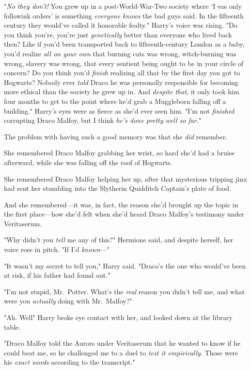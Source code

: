 "\emph{No they don't!} You grew up in a post-World-War-Two society where `I vas
only followink orders' is something \emph{everyone knows} the bad guys said. In
the fifteenth century they would've called it honorable fealty." Harry's voice
was rising. "Do you think you're, you're just \emph{genetically} better than
everyone who lived back then? Like if you'd been transported back to
fifteenth-century London as a baby, you'd realize \emph{all on your own} that
burning cats was wrong, witch-burning was wrong, slavery was wrong, that every
sentient being ought to be in your circle of concern? Do you think you'd
\emph{finish} realizing all that by the first day you got to Hogwarts? Nobody
ever \emph{told} Draco he was personally responsible for becoming more ethical
than the society he grew up in. And \emph{despite that}, it only took him four
months to get to the point where he'd grab a Muggleborn falling off a
building." Harry's eyes were as fierce as she'd ever seen him. "I'm not
\emph{finished} corrupting Draco Malfoy, but I think \emph{he's done pretty
well so far.}"

The problem with having such a good memory was that she \emph{did} remember.

She remembered Draco Malfoy grabbing her wrist, so hard she'd had a bruise
afterward, while she was falling off the roof of Hogwarts.

She remembered Draco Malfoy helping her up, after that mysterious tripping jinx
had sent her stumbling into the Slytherin Quidditch Captain's plate of food.

And she remembered---it was, in fact, the reason she'd brought up the topic in
the first place---how she'd felt when she'd heard Draco Malfoy's testimony
under Veritaserum.

"Why didn't you \emph{tell} me any of this?" Hermione said, and despite
herself, her voice rose in pitch. "If I'd \emph{known}\mbox{---}"

"It wasn't my secret to tell you," Harry said. "Draco's the one who would've
been at risk, if his father had found out."

"I'm not stupid, Mr.~Potter. What's the \emph{real} reason you didn't tell me,
and what were you \emph{actually} doing with Mr.~Malfoy?"

"Ah. Well{\el}" Harry broke eye contact with her, and looked down at the
library table.

"Draco Malfoy told the Aurors under Veritaserum that he wanted to know if he
could beat me, so he challenged me to a duel to \emph{test it empirically}.
Those were his \emph{exact words} according to the transcript."

